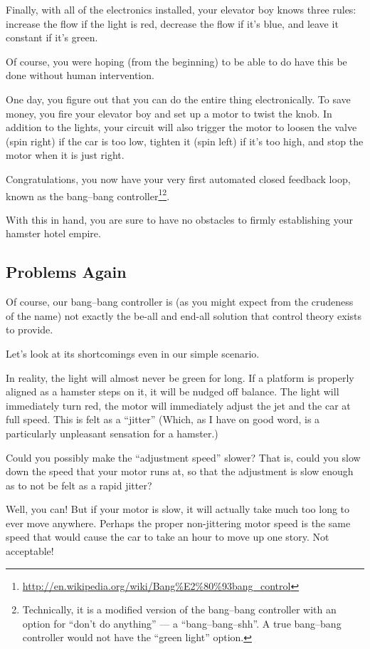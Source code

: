 \documentclass[]{article}
\renewcommand{\href}[2]{#2\footnote{\url{#1}}}
\begin{document}
Finally, with all of the electronics installed, your elevator boy knows three
rules: increase the flow if the light is red, decrease the flow if it's blue,
and leave it constant if it's green.

Of course, you were hoping (from the beginning) to be able to do have this be
done without human intervention.

One day, you figure out that you can do the entire thing electronically. To save
money, you fire your elevator boy and set up a motor to twist the knob. In
addition to the lights, your circuit will also trigger the motor to loosen the
valve (spin right) if the car is too low, tighten it (spin left) if it's too
high, and stop the motor when it is just right.

Congratulations, you now have your very first automated closed feedback loop,
known as the
\href{http://en.wikipedia.org/wiki/Bang\%E2\%80\%93bang_control}{bang--bang
controller}\footnote{Technically, it is a modified version of the bang--bang
  controller with an option for ``don't do anything'' --- a ``bang--bang--shh''.
  A true bang--bang controller would not have the ``green light'' option.}.

With this in hand, you are sure to have no obstacles to firmly establishing your
hamster hotel empire.

\subsection{Problems Again}\label{problems-again}

Of course, our bang--bang controller is (as you might expect from the crudeness
of the name) not exactly the be-all and end-all solution that control theory
exists to provide.

Let's look at its shortcomings even in our simple scenario.

In reality, the light will almost never be green for long. If a platform is
properly aligned as a hamster steps on it, it will be nudged off balance. The
light will immediately turn red, the motor will immediately adjust the jet and
the car at full speed. This is felt as a ``jitter'' (Which, as I have on good
word, is a particularly unpleasant sensation for a hamster.)

Could you possibly make the ``adjustment speed'' slower? That is, could you slow
down the speed that your motor runs at, so that the adjustment is slow enough as
to not be felt as a rapid jitter?

Well, you can! But if your motor is slow, it will actually take much too long to
ever move anywhere. Perhaps the proper non-jittering motor speed is the same
speed that would cause the car to take an hour to move up one story. Not
acceptable!
\end{document}
